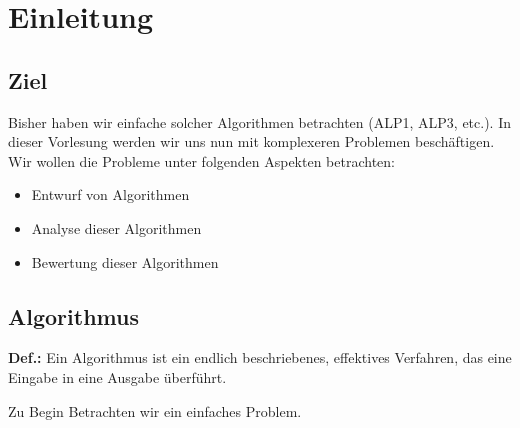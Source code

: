 \chapter{Einleitung}

\section{Ziel}


Bisher haben wir einfache solcher Algorithmen betrachten (ALP1, ALP3, etc.). In dieser Vorlesung werden wir uns nun mit komplexeren Problemen beschäftigen. Wir wollen die Probleme unter folgenden Aspekten betrachten:

\begin{itemize}

\item Entwurf von Algorithmen

\item Analyse dieser Algorithmen

\item Bewertung dieser Algorithmen

\end{itemize}

\section{Algorithmus}

\begin{description}

\item{\textbf{Def.:}} Ein Algorithmus ist ein endlich beschriebenes, effektives Verfahren, das eine Eingabe in eine Ausgabe überführt.

\end{description}


Zu Begin Betrachten wir ein einfaches Problem.